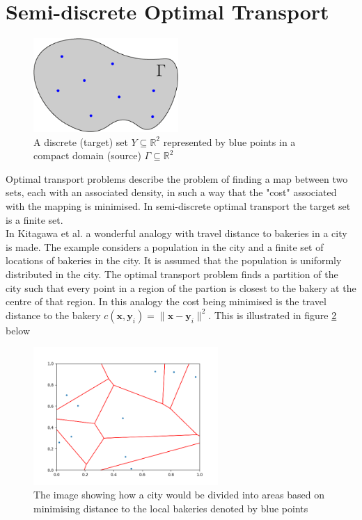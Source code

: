 \section{Semi-discrete Optimal Transport}
\begin{figure}[h]
	\centering
	\includegraphics[width=5.5cm]{project/probmeasure}
	\caption[Semi-discrete Optimal Transport]{A discrete (target) set $Y \subseteq \mathbb{R}^2$ represented by blue points in a compact domain (source) $\Gamma \subseteq \mathbb{R}^2 $}
	\label{fig:probmeasure}
\end{figure}
Optimal transport problems describe the problem of finding a map between two sets, each with an associated density, in such a way that the "cost" associated with the mapping is minimised. In semi-discrete optimal transport the target set is a finite set.\\
\linebreak
In Kitagawa et al. \cite{Kitagawa2016} a wonderful analogy with travel distance to bakeries in a city is made. The example considers a population in the city and a finite set of locations of bakeries in the city. It is assumed that the population is uniformly distributed in the city. The optimal transport problem finds a partition of the city such that every point in a region of the partion is closest to the bakery at the centre of that region. In this analogy the cost being minimised is the travel distance to the bakery $c(\bm{x},\bm{y}_i) = \|\bm{x}-\bm{y}_i \|^2$. This is illustrated in figure \ref{fig:laguerrediagram0w}  below
\begin{figure}[h]
	\centering
	\includegraphics[width=7cm]{project/laguerre_diagram_0w}
	\caption[The partitioning of a Domain]{The image showing how a city would be divided into areas based on minimising distance to the local bakeries denoted by blue points}
	\label{fig:laguerrediagram0w}
\end{figure}
